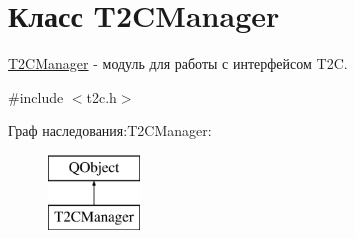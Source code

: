 \hypertarget{class_t2_c_manager}{\section{Класс T2\-C\-Manager}
\label{class_t2_c_manager}
}


\hyperlink{class_t2_c_manager}{T2\-C\-Manager} -\/ модуль для работы с интерфейсом T2\-C.  




{\ttfamily \#include $<$t2c.\-h$>$}

Граф наследования\-:T2\-C\-Manager\-:\begin{figure}[H]
\begin{center}
\leavevmode
\includegraphics[height=2.000000cm]{class_t2_c_manager}
\end{center}
\end{figure}
